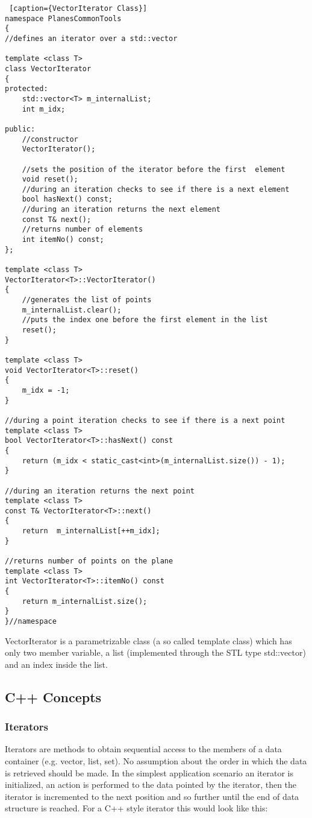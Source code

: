 \begin{lstlisting} [caption={VectorIterator Class}]
namespace PlanesCommonTools
{
//defines an iterator over a std::vector

template <class T>
class VectorIterator
{
protected:
    std::vector<T> m_internalList;
    int m_idx;

public:
    //constructor
    VectorIterator();

    //sets the position of the iterator before the first  element
    void reset();
    //during an iteration checks to see if there is a next element
    bool hasNext() const;
    //during an iteration returns the next element
    const T& next();
    //returns number of elements
    int itemNo() const;
};

template <class T>
VectorIterator<T>::VectorIterator()
{
    //generates the list of points
    m_internalList.clear();
    //puts the index one before the first element in the list
    reset();
}

template <class T>
void VectorIterator<T>::reset()
{
    m_idx = -1;
}

//during a point iteration checks to see if there is a next point
template <class T>
bool VectorIterator<T>::hasNext() const
{
    return (m_idx < static_cast<int>(m_internalList.size()) - 1);
}

//during an iteration returns the next point
template <class T>
const T& VectorIterator<T>::next()
{
    return  m_internalList[++m_idx];
}

//returns number of points on the plane
template <class T>
int VectorIterator<T>::itemNo() const
{
    return m_internalList.size();
}
}//namespace

\end{lstlisting}

VectorIterator is a parametrizable class (a so called template class) which has only two member variable, a list (implemented through the STL type std::vector) and an index inside the list. 

\subsection {C++ Concepts}
\subsubsection {Iterators}

Iterators are methods to obtain sequential access to the members of a data container (e.g. vector, list, set). No assumption about the order in which the data is retrieved should be made. In the simplest application scenario an iterator is initialized, an action is performed to the data pointed by the iterator, then the iterator is incremented to the next position and so further until the end of data structure is reached. For a C++ style iterator this would look like this:

